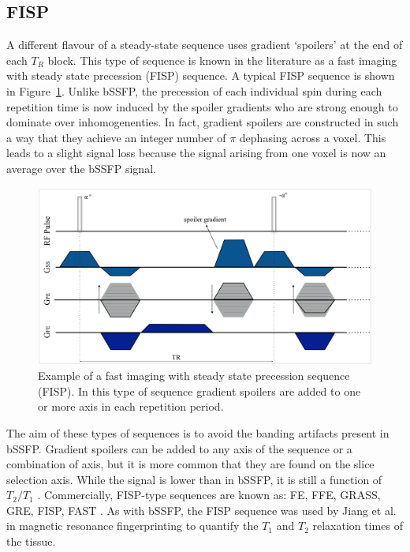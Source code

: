 \subsection{FISP}
\label{MRIFISP}

A different flavour of a steady-state sequence uses gradient `spoilers' at the end of each $T_R$ block.
This type of sequence is known in the literature as a fast imaging with steady state precession (FISP) sequence.
A typical FISP sequence is shown in Figure~\ref{fig:fisp}.
Unlike bSSFP, the precession of each individual spin during each repetition time is now induced by the spoiler gradients who are strong enough to dominate over inhomogenenties.
In fact, gradient spoilers are constructed in such a way that they achieve an integer number of $\pi$ dephasing across a voxel.
This leads to a slight signal loss because the signal arising from one voxel is now an average over the bSSFP signal.

\begin{figure}[ht]
    \centering
    \includegraphics[width=1\textwidth,keepaspectratio]{images/mri/fisp}
    \caption{Example of a fast imaging with steady state precession sequence (FISP). 
    In this type of sequence gradient spoilers are added to one or more axis in each repetition period.}
    \label{fig:fisp}
\end{figure}

The aim of these types of sequences is to avoid the banding artifacts present in bSSFP.
Gradient spoilers can be added to any axis of the sequence or a combination of axis, but it is more common that they are found on the slice selection axis.
While the signal is lower than in bSSFP, it is still a function of $T_2/T_1$ .
Commercially, FISP-type sequences are known as: FE, FFE, GRASS, GRE, FISP, FAST \cite{Hargreaves2012}.
As with bSSFP, the FISP sequence was used by Jiang et al. \cite{Jiang2015} in magnetic resonance fingerprinting to quantify the $T_1$ and $T_2$ relaxation times of the tissue.
